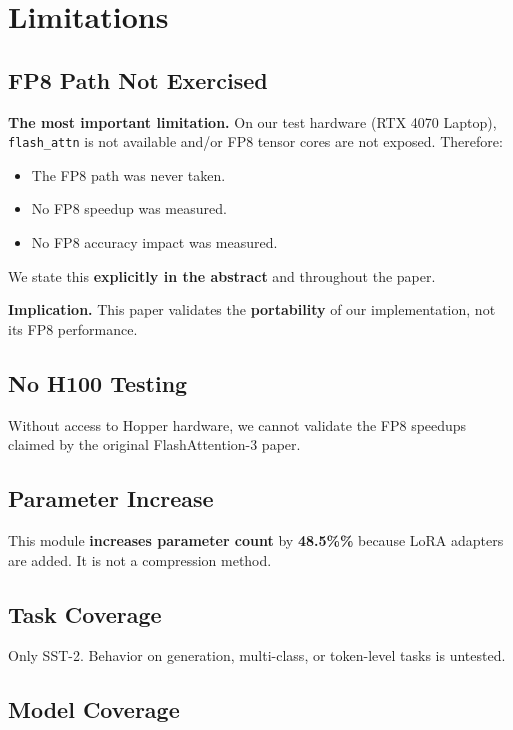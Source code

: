 
\section{Limitations}

\subsection{FP8 Path Not Exercised}

\textbf{The most important limitation.} On our test hardware (RTX 4070 Laptop), 
\texttt{flash\_attn} is not available and/or FP8 tensor cores are not exposed. 
Therefore:

\begin{itemize}
\item The FP8 path was never taken.
\item No FP8 speedup was measured.
\item No FP8 accuracy impact was measured.

\end{itemize}
We state this \textbf{explicitly in the abstract} and throughout the paper.

\textbf{Implication.} This paper validates the \textbf{portability} of our 
implementation, not its FP8 performance.

\subsection{No H100 Testing}

Without access to Hopper hardware, we cannot validate the FP8 speedups 
claimed by the original FlashAttention-3 paper.

\subsection{Parameter Increase}

This module \textbf{increases parameter count} by \textbf{48.5\%\%} because 
LoRA adapters are added. It is not a compression method.

\subsection{Task Coverage}

Only SST-2. Behavior on generation, multi-class, or token-level tasks 
is untested.

\subsection{Model Coverage}

